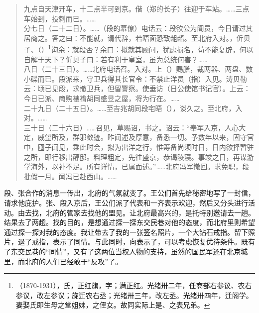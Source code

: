 \begin{quote}
	九点自天津开车，十二点半可到京。偕（郑的长子）往迎于车站。……三点车始到，投刺而已。……\\

分七日（二十二日）。……（段的幕僚）电话云：段欲公为阁员，今日请过其居商之。答之曰：不能就，请代辞，若晤面恐致龃龉。至北府入对。，伒贝子、（）\footnote{（1870-1931），氏，正红旗，字；满正红。光绪卅二年，任商部右参议、农右参议，改左参议；旋迁农右丞；光绪卅三年，改左丞。光绪卅四年，迁阁学。妻娶氏即生母之堂姐妹，之侄女。故同实际上是、之表兄弟。}询余：就段否？余曰：拟就其顾问，犹虑损名，苟不能复辟，何以自解于天下？伒贝子曰：若有利于皇室，虽为总统何害？……\\

八日（二十三日）。……北府电话召。入对。上（）赐膳，裁两器、两盘、数小碟而已。段派来，守卫兵得其长官令：不禁止洋员（指）入见。涛贝勒云：顷已见段，求撤卫兵，但留警察。使垂访（日公使馆书记官）。上云：今日已派、商购裱褙胡同盛昱之屋，将为行在。……\\

二十九日（二十五日）。……至吉兆胡同段宅晤（），谈久之。至北府，入对。……\\

三十日（二十六日）……召见，草赐诏，书之。诏云：“奉军入京，人心大定，威望所及，群邪敛迹。昨闻述及厚意，备悉一切。予数年以来，固守官中，囤子闻见，乘此时会，拟为出洋之行，惟筹备尚须时日，日内欲择暂驻之所，即行移出醇邸。料理粗定，先往盛京，恭谒陵寝。事竣之日，再谋游学海外，以补不足。所有详情，已属面述。”……北府冯军撤回。求免职，段批假一月。闻冯已赴西山。……\\
\end{quote}

段、张合作的消息一传出，北府的气氛就变了。王公们首先给秘密地写了一封信，请求他庇护。张、段入京后，王公们派了代表和一齐表示欢迎，然后又分头进行活动。由去找，北府的管家去找他的盟见。让北府最高兴的，是托特别邀请去一趟。结果去了两趟。找的目的，是想通过探一探东交民巷对他的态度，而北府里则希望通过探一探对我的态度。我让带去了我的一张签名照片，一个大钻石戒指。留下照片，退了戒指，表示了同情。与此同时，向表示了，可以考虑恢复优待条件。既有了东交民巷的“同情”，又有了这两位当权人物的支持，虽然的国民军还在北京城里，而北府的人们已经敢于“反攻”了。\\

